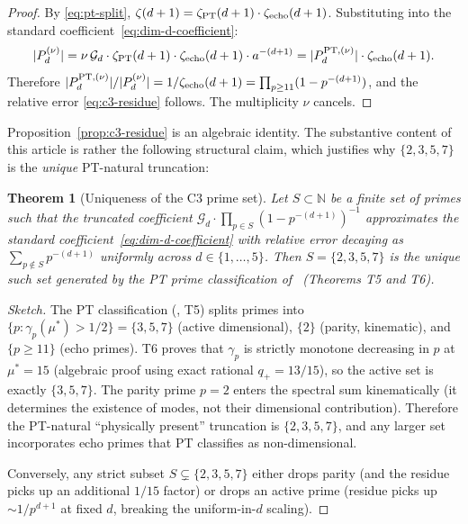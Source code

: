 \documentclass[11pt,a4paper]{article}
\newtheorem{theorem}{Theorem}
\newcommand{\actives}{\{3,5,7\}}
\newcommand{\PTset}{\{2,3,5,7\}}
\begin{document}
\begin{proof}
By \eqref{eq:pt-split}, $\zeta(d+1) = \zeta_{\rm PT}(d+1) \cdot \zeta_{\rm echo}(d+1)$.
Substituting into the standard coefficient~\eqref{eq:dim-d-coefficient}:
\[
|P_{d}^{(\nu)}| = \nu\,\mathcal{G}_{d} \cdot \zeta_{\rm PT}(d+1) \cdot \zeta_{\rm echo}(d+1) \cdot a^{-(d+1)} = |P_{d}^{{\rm PT},(\nu)}| \cdot \zeta_{\rm echo}(d+1).
\]
Therefore $|P_{d}^{{\rm PT},(\nu)}|/|P_{d}^{(\nu)}| = 1/\zeta_{\rm echo}(d+1) = \prod_{p \geq 11}(1-p^{-(d+1)})$,
and the relative error \eqref{eq:c3-residue} follows. The multiplicity $\nu$ cancels.
\end{proof}

Proposition~\ref{prop:c3-residue} is an algebraic identity. The substantive content of this
article is rather the following structural claim, which justifies why $\PTset$ is the
\emph{unique} PT-natural truncation:

\begin{theorem}[Uniqueness of the C3 prime set]
\label{thm:c3-uniqueness}
Let $S \subset \mathbb{N}$ be a finite set of primes such that the truncated coefficient
$\mathcal{G}_{d} \cdot \prod_{p \in S}(1-p^{-(d+1)})^{-1}$ approximates the standard
coefficient~\eqref{eq:dim-d-coefficient} with relative error decaying as
$\sum_{p \notin S} p^{-(d+1)}$ uniformly across $d \in \{1,\ldots,5\}$. Then $S = \PTset$ is
the unique such set generated by the PT prime classification of~\cite{Senez2026} (Theorems T5
and T6).
\end{theorem}

\begin{proof}[Sketch]
The PT classification (\cite{Senez2026}, T5) splits primes into $\{p : \gamma_p(\mu^*) > 1/2\}
= \actives$ (active dimensional), $\{2\}$ (parity, kinematic), and $\{p \geq 11\}$ (echo primes). T6
proves that $\gamma_p$ is strictly monotone decreasing in $p$ at $\mu^* = 15$ (algebraic
proof using exact rational $q_+ = 13/15$), so the active set is exactly $\{3, 5, 7\}$. The
parity prime $p = 2$ enters the spectral sum kinematically (it determines the existence of
modes, not their dimensional contribution). Therefore the PT-natural ``physically present''
truncation is $\PTset$, and any larger set incorporates echo primes that PT classifies as
non-dimensional.

Conversely, any strict subset $S \subsetneq \PTset$ either drops parity (and the residue picks
up an additional $1/15$ factor) or drops an active prime (residue picks up $\sim 1/p^{d+1}$ at
fixed $d$, breaking the uniform-in-$d$ scaling).
\end{proof}
\end{document}

